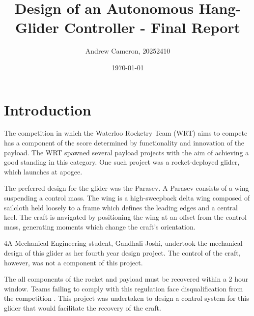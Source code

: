 \documentclass{sydeStyle}
\title{
Design of an Autonomous Hang-Glider Controller - Final Report
}
\date{\today}
\author{Andrew Cameron, 20252410}
\begin{document}

\maketitle

\tableofcontents

\chapter{Introduction}

The competition in which the Waterloo Rocketry Team (WRT) aims to compete has a
component of the score determined by functionality and innovation of the
payload\cite{IREC}. The WRT spawned several payload projects with the aim of
achieving a good standing in this category. One such project was a
rocket-deployed glider, which launches at apogee.

The preferred design for the glider was the Parasev. A Parasev consists of a
wing suspending a control mass\cite{wiki:parasev}. The wing is a high-sweepback
delta wing composed of sailcloth held loosely to a frame which defines the
leading edges and a central keel. The craft is navigated by positioning the wing
at an offset from the control mass, generating moments which change the craft's
orientation.

4A Mechanical Engineering student, Gandhali Joshi, undertook the mechanical
design of this glider as her fourth year design project. The control of the
craft, however, was not a component of this project.

The all components of the rocket and payload must be recovered within a 2 hour
window. Teams failing to comply with this regulation face disqualification from
the competition \cite{IREC}. This project was undertaken to design a control
system for this glider that would facilitate the recovery of the craft.
\end{document}
